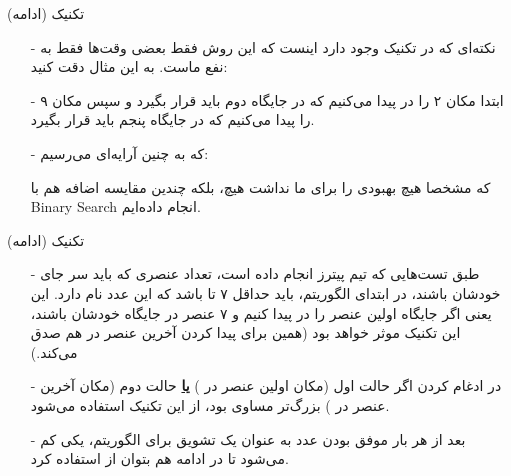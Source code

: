 \begin{frame}{تکنیک  (ادامه)}
\begin{itemize}\itemr
\item[-]
نکته‌ای که در تکنیک  وجود دارد اینست که این روش فقط بعضی وقت‌ها فقط به نفع ماست. به این مثال دقت کنید:
\begin{lfl}
\end{lfl}

\item[-]
ابتدا مکان ۲ را در 
پیدا می‌کنیم که در جایگاه دوم باید قرار بگیرد و سپس مکان ۹ را پیدا می‌کنیم که در جایگاه پنجم باید قرار بگیرد.

\item[-]
که به چنین آرایه‌ای می‌رسیم:
\begin{lfl}
\end{lfl}

که مشخصا هیچ بهبودی را برای ما نداشت هیچ، بلکه چندین مقایسه اضافه‌ هم با Binary Search انجام داده‌ایم.
\end{itemize}
\end{frame}

\begin{frame}{تکنیک  (ادامه)}
\begin{itemize}\itemr
\item[-]
طبق تست‌هایی که تیم پیترز انجام داده است، تعداد عنصری که باید سر جای خودشان باشند، در ابتدای الگوریتم، باید حداقل ۷ تا باشد که این عدد نام  دارد. این یعنی اگر جایگاه اولین عنصر 
را در 
پیدا کنیم و ۷ عنصر در جایگاه خودشان باشند، این تکنیک موثر خواهد بود (همین برای پیدا کردن آخرین عنصر  در  هم صدق می‌کند.)

\item[-]
در ادغام کردن اگر حالت اول (مکان اولین عنصر  در ) \textbf{\underline{یا}} حالت دوم (مکان آخرین عنصر  در ) بزرگ‌تر مساوی  بود، از این تکنیک استفاده می‌شود.

\item[-]
بعد از هر بار موفق بودن  عدد  به عنوان یک تشویق برای الگوریتم، یکی کم می‌شود تا در ادامه هم بتوان از  استفاده کرد.
\end{itemize}
\end{frame}

